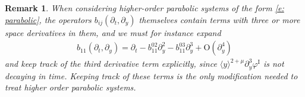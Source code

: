 \documentclass[11pt]{article}
\renewcommand{\phi}{\varphi}
\newtheorem{remark}[prop]{Remark}
\numberwithin{equation}{section}
\numberwithin{prop}{section}
\newcommand{\phiI}{\phi^\mathrm{I}}
\begin{document}
\begin{remark}\label{rmk: parabolic}
	When considering higher-order parabolic systems of the form \eqref{e: parabolic}, the operators $b_{ij}(\partial_t, \partial_y)$ themselves contain terms with three or more space derivatives in them, and we must for instance expand
	\begin{align}
	b_{11}(\partial_t, \partial_y) = \partial_t - b_{11}^{02} \partial_y^2 - b_{11}^{03} \partial_y^3 + \mathrm{O}(\partial_y^4)
	\end{align}
	and keep track of the third derivative term explicitly, since $\langle y \rangle^{2 + \mu} \partial_y^3 \phiI$ is not decaying in time. Keeping track of these terms is the only modification needed to treat higher order parabolic systems. 
\end{remark}
\end{document}
